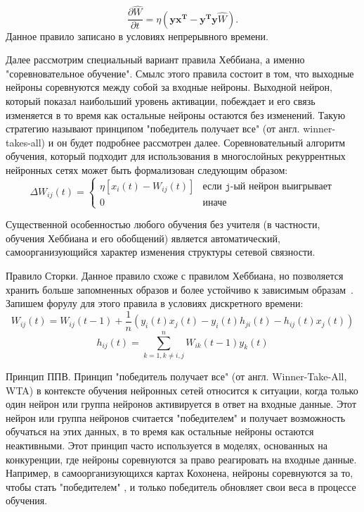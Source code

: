 \documentclass[14pt, russian]{scrartcl}
\begin{document}
\begin{equation}\label{eq:10}
    \frac{\partial \hat{W}}{\partial t} = \eta (\mathbf{y x^T} - \mathbf{y^T y} \hat{W}).
\end{equation}Данное правило записано в условиях непрерывного времени.

Далее рассмотрим специальный вариант правила Хеббиана, а именно "соревновательное обучение". Смылс этого правила состоит в том, что выходные нейроны соревнуются между собой за входные нейроны.
Выходной нейрон, который показал наибольший уровень активации, побеждает и его связь изменяется в то время как остальные нейроны остаются без изменений. Такую стратегию называют принципом "победитель получает все" (от англ. winner-takes-all) и он будет подробнее рассмотрен далее.
Соревновательный алгоритм обучения, который подходит для использования в многослойных рекуррентных нейронных сетях может быть формализован следующим образом:
 \begin{equation}\label{eq:11}
    \Delta W_{ij}(t) = 
    \begin{cases}
        \eta[x_i(t) - W_{ij}(t)] & \texttt{если j-ый нейрон выигрывает} \\
        0 & \texttt{иначе}
    \end{cases}
\end{equation}

Существенной особенностью любого обучения без учителя (в частности, обучения Хеббиана и его обобщений) является автоматический,
самоорганизующийся характер изменения структуры сетевой связности.

Правило Сторки. Данное правило схоже с правилом Хеббиана, но позволяется хранить больше запомненных образов и более устойчиво к зависимым образам~\cite{28}. 
Запишем форулу для этого правила в условиях дискретного времени:
\begin{equation}\label{eq:12}
    W_{ij}(t) = W_{ij}(t-1) + \frac{1}{n} (y_i(t) x_j(t) - y_i(t) h_{ji}(t) - h_{ij}(t) x_j(t))
\end{equation}
\begin{equation}\label{eq:13}
    h_{ij}(t) = \sum_{k = 1, k \neq i,j}^{n} W_{ik}(t-1) y_{k} (t)
\end{equation}

Принцип ППВ. Принцип "победитель получает все" (от англ. Winner-Take-All, WTA) в контексте обучения нейронных сетей относится к ситуации, когда только один нейрон или группа нейронов активируется в ответ на входные данные. Этот нейрон или группа нейронов считается "победителем" и получает возможность обучаться на этих данных, в то время как остальные нейроны остаются неактивными.
Этот принцип часто используется в моделях, основанных на конкуренции, где нейроны соревнуются за право реагировать на входные данные. Например, в самоорганизующихся картах Кохонена, нейроны соревнуются за то, чтобы стать "победителем" , и только победитель обновляет свои веса в процессе обучения.
\end{document}

